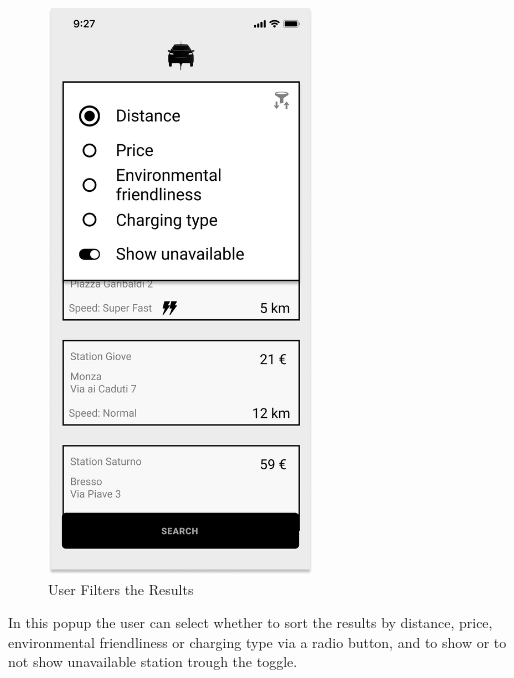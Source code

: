\begin{figure}[H]
    \centering
    \includegraphics[keepaspectratio, height=15cm]{AppInterface/Filter Menu.png}
    \caption{User Filters the Results}
    \label{fig:Filters}
\end{figure}
In this popup the user can select whether to sort the results by distance, price, environmental friendliness or charging type via a radio button, and to show or to not show unavailable station trough the toggle.

